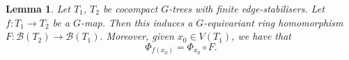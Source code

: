 \documentclass[11pt,a4paper]{amsart}
\newtheorem{lemma}[theorem]{Lemma}
\theoremstyle{definition}
\newcommand{\per}{\mathcal{H}}
\newcommand{\br}{{\mathscr{B}}}
\begin{document}








    

\begin{lemma}\label{lem:g-map-gives-br-map}
    Let $T_1$, $T_2$ be cocompact $G$-trees with finite edge-stabilisers. Let $f : T_1 \to T_2$ be a $G$-map. Then this  induces a $G$-equivariant ring homomorphism
    $
    F : \br(T_2) \to \br(T_1).
    $
    Moreover, given $x_0 \in V(T_1)$, we have that 
    $$
    \Phi_{f(x_0)} = \Phi_{x_0} \circ F.
    $$
\end{lemma}
\end{document}
